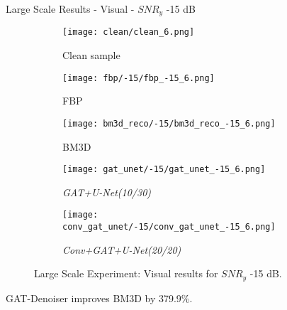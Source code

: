 \begin{frame}{Large Scale Results - Visual - $SNR_y$ -15 dB}
    \begin{figure}
        \captionsetup[subfigure]{justification=centering}
        \centering
        \begin{subfigure}[t]{0.18\textwidth}
          \texttt{[image: clean/clean\_6.png]}
          \caption{Clean sample}
        \end{subfigure} \hfill
        \begin{subfigure}[t]{0.18\textwidth}
          \texttt{[image: fbp/-15/fbp\_-15\_6.png]}
          \caption{FBP}
        \end{subfigure} \hfill
        \begin{subfigure}[t]{0.18\textwidth}
          \texttt{[image: bm3d\_reco/-15/bm3d\_reco\_-15\_6.png]}
          \caption{BM3D}
        \end{subfigure} \hfill
        \begin{subfigure}[t]{0.18\textwidth}
          \texttt{[image: gat\_unet/-15/gat\_unet\_-15\_6.png]}
          \caption{\textit{GAT+U-Net(10/30)}}
        \end{subfigure} \hfill
        \begin{subfigure}[t]{0.18\textwidth}
          \texttt{[image: conv\_gat\_unet/-15/conv\_gat\_unet\_-15\_6.png]}
          \caption{\textit{Conv+GAT+U-Net(20/20)}}
        \end{subfigure} \hfill
        \caption{Large Scale Experiment: Visual results for $SNR_y$ -15 dB.}
      \end{figure}
      
    
      \begin{tcolorbox}[colback=red!5!white,hide=<1>, alert=<2>, colframe=red!75!black]
        GAT-Denoiser improves BM3D by 379.9\%.
        \end{tcolorbox}
        
\end{frame}

 

         
         

